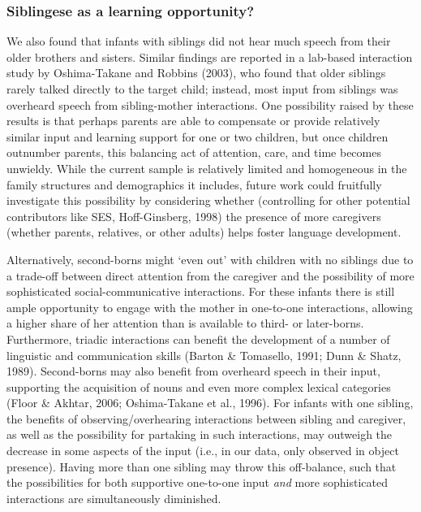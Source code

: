 \documentclass[
  man,floatsintext]{apa6}
\begin{document}
\hypertarget{siblingese-as-a-learning-opportunity}{%
\subsubsection{Siblingese as a learning opportunity?}\label{siblingese-as-a-learning-opportunity}}

We also found that infants with siblings did not hear much speech from their older brothers and sisters. Similar findings are reported in a lab-based interaction study by Oshima-Takane and Robbins (2003), who found that older siblings rarely talked directly to the target child; instead, most input from siblings was overheard speech from sibling-mother interactions. One possibility raised by these results is that perhaps parents are able to compensate or provide relatively similar input and learning support for one or two children, but once children outnumber parents, this balancing act of attention, care, and time becomes unwieldy. While the current sample is relatively limited and homogeneous in the family structures and demographics it includes, future work could fruitfully investigate this possibility by considering whether (controlling for other potential contributors like SES, Hoff-Ginsberg, 1998) the presence of more caregivers (whether parents, relatives, or other adults) helps foster language development.

Alternatively, second-borns might `even out' with children with no siblings due to a trade-off between direct attention from the caregiver and the possibility of more sophisticated social-communicative interactions. For these infants there is still ample opportunity to engage with the mother in one-to-one interactions, allowing a higher share of her attention than is available to third- or later-borns. Furthermore, triadic interactions can benefit the development of a number of linguistic and communication skills (Barton \& Tomasello, 1991; Dunn \& Shatz, 1989). Second-borns may also benefit from overheard speech in their input, supporting the acquisition of nouns and even more complex lexical categories (Floor \& Akhtar, 2006; Oshima-Takane et al., 1996). For infants with one sibling, the benefits of observing/overhearing interactions between sibling and caregiver, as well as the possibility for partaking in such interactions, may outweigh the decrease in some aspects of the input (i.e., in our data, only observed in object presence). Having more than one sibling may throw this off-balance, such that the possibilities for both supportive one-to-one input \emph{and} more sophisticated interactions are simultaneously diminished.
\end{document}
